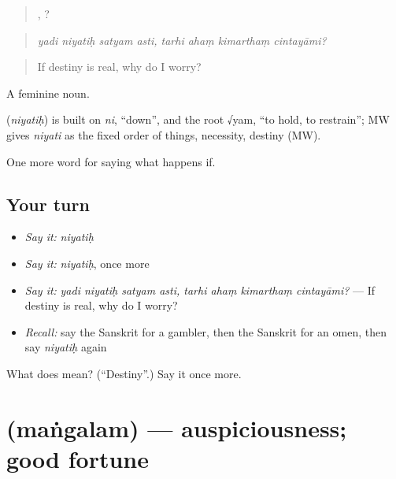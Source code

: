 \begin{quote}
   ,    ?
\end{quote}

\begin{quote}
\emph{yadi niyatiḥ satyam asti, tarhi ahaṃ kimarthaṃ cintayāmi?}
\end{quote}

\begin{quote}
If destiny is real, why do I worry?
\end{quote}

A feminine noun.

\begin{cousinweb}
\textbf{} (\emph{niyatiḥ}) is built on \emph{ni}, \textquotedblleft{}down\textquotedblright{}, and the root √yam, \textquotedblleft{}to hold, to restrain\textquotedblright{}; MW gives \emph{niyati} as the fixed order of things, necessity, destiny (MW).
\end{cousinweb}

\begin{grammarlens}[title={What you've built}]
One more word for saying what happens if.
\end{grammarlens}

\subsection*{Your turn}
\begin{itemize}
\raggedright
  \item \emph{Say it:} \emph{niyatiḥ}
  \item \emph{Say it:} \emph{niyatiḥ}, once more
  \item \emph{Say it:} \emph{yadi niyatiḥ satyam asti, tarhi ahaṃ kimarthaṃ cintayāmi?} — If destiny is real, why do I worry?
  \item \emph{Recall:} say the Sanskrit for a gambler, then the Sanskrit for an omen, then say \emph{niyatiḥ} again
\end{itemize}

\begin{tcolorbox}[breakable,colback=teal!4,colframe=teal!35!black,title={Before you move on}]
What does  mean? (\textquotedblleft{}Destiny\textquotedblright{}.) Say it once more.
\end{tcolorbox}
\section[\texorpdfstring{\sk{मंगलम्} (maṅgalam)}{मंगलम् (maṅgalam)}]{ (maṅgalam) — auspiciousness; good fortune}

